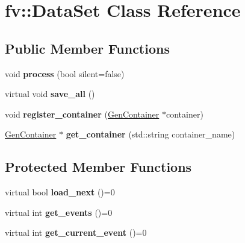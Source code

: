 \hypertarget{classfv_1_1DataSet}{}\section{fv\+:\+:Data\+Set Class Reference}
\label{classfv_1_1DataSet}
\subsection*{Public Member Functions}
\begin{DoxyCompactItemize}
\item 
\hypertarget{classfv_1_1DataSet_a77975c8e8f46b4c9b9dd6f5a83fd05ed}{}\label{classfv_1_1DataSet_a77975c8e8f46b4c9b9dd6f5a83fd05ed} 
void {\bfseries process} (bool silent=false)
\item 
\hypertarget{classfv_1_1DataSet_a115ab5a200c64b8df54d17d0dd6524cf}{}\label{classfv_1_1DataSet_a115ab5a200c64b8df54d17d0dd6524cf} 
virtual void {\bfseries save\+\_\+all} ()
\item 
\hypertarget{classfv_1_1DataSet_aa9b414d264b13ab78c5153fbaea13c89}{}\label{classfv_1_1DataSet_aa9b414d264b13ab78c5153fbaea13c89} 
void {\bfseries register\+\_\+container} (\hyperlink{classfv_1_1GenContainer}{Gen\+Container} $\ast$container)
\item 
\hypertarget{classfv_1_1DataSet_a045e7756fe5970cdaab953f12af25de5}{}\label{classfv_1_1DataSet_a045e7756fe5970cdaab953f12af25de5} 
\hyperlink{classfv_1_1GenContainer}{Gen\+Container} $\ast$ {\bfseries get\+\_\+container} (std\+::string container\+\_\+name)
\end{DoxyCompactItemize}
\subsection*{Protected Member Functions}
\begin{DoxyCompactItemize}
\item 
\hypertarget{classfv_1_1DataSet_ac11e2a57a0712aa572f398f275f5821b}{}\label{classfv_1_1DataSet_ac11e2a57a0712aa572f398f275f5821b} 
virtual bool {\bfseries load\+\_\+next} ()=0
\item 
\hypertarget{classfv_1_1DataSet_a54bec77bf1597c504c1f3e56c076110f}{}\label{classfv_1_1DataSet_a54bec77bf1597c504c1f3e56c076110f} 
virtual int {\bfseries get\+\_\+events} ()=0
\item 
\hypertarget{classfv_1_1DataSet_a0e69eac5f063215fc00a3f387cb8e682}{}\label{classfv_1_1DataSet_a0e69eac5f063215fc00a3f387cb8e682} 
virtual int {\bfseries get\+\_\+current\+\_\+event} ()=0
\end{DoxyCompactItemize}
